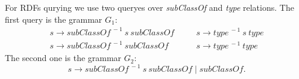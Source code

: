For RDFs qurying we use two queryes over \textit{subClassOf} and \textit{type} relations.
The first query is the grammar $G_1$:
\[
 \begin{array}{lcl}
   s  \rightarrow \textit{subClassOf}^{\ -1} \ s \ \textit{subClassOf}   & \quad & s  \rightarrow \textit{type}^{\ -1} \ s \ \textit{type}     \\
   s  \rightarrow \textit{subClassOf}^{\ -1} \ \textit{subClassOf}       & \quad & s  \rightarrow  \textit{type}^{\ -1}  \ \textit{type}

 \end{array}
 \]
The second one is the grammar $G_2$: $$s \rightarrow \textit{subClassOf}^{\ -1} \ s \ \textit{subClassOf} \mid  \textit{subClassOf}.$$

%
%
%
%
%
%
